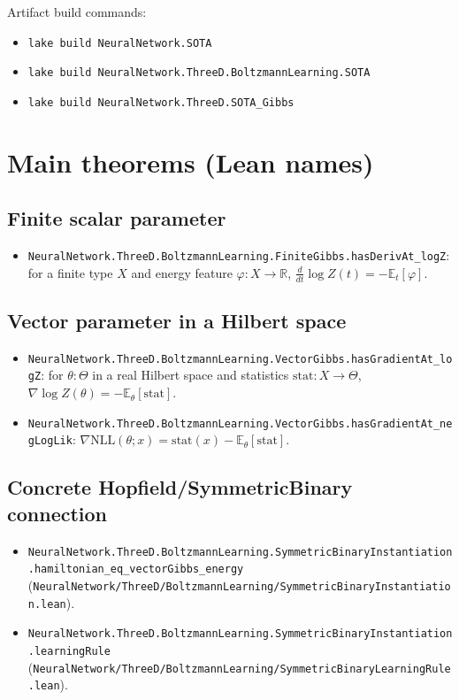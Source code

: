 \documentclass[11pt]{article}
\newcommand{\lean}[1]{\texttt{#1}}
\newcommand{\file}[1]{\texttt{#1}}
\begin{document}
Artifact build commands:
\begin{itemize}[leftmargin=2em]
\item \lean{lake build NeuralNetwork.SOTA}
\item \lean{lake build NeuralNetwork.ThreeD.BoltzmannLearning.SOTA}
\item \lean{lake build NeuralNetwork.ThreeD.SOTA_Gibbs}
\end{itemize}

\section{Main theorems (Lean names)}
\subsection{Finite scalar parameter}
\begin{itemize}[leftmargin=2em]
\item \lean{NeuralNetwork.ThreeD.BoltzmannLearning.FiniteGibbs.hasDerivAt_logZ}:
  for a finite type \(X\) and energy feature \(\varphi : X \to \mathbb{R}\),
  \(\frac{d}{dt} \log Z(t) = -\mathbb{E}_t[\varphi]\).
\end{itemize}

\subsection{Vector parameter in a Hilbert space}
\begin{itemize}[leftmargin=2em]
\item \lean{NeuralNetwork.ThreeD.BoltzmannLearning.VectorGibbs.hasGradientAt_logZ}:
  for \(\theta : \Theta\) in a real Hilbert space and statistics
  \(\mathrm{stat} : X \to \Theta\),
  \(\nabla \log Z(\theta) = -\mathbb{E}_{\theta}[\mathrm{stat}]\).
\item \lean{NeuralNetwork.ThreeD.BoltzmannLearning.VectorGibbs.hasGradientAt_negLogLik}:
  \(\nabla\mathrm{NLL}(\theta;x)=\mathrm{stat}(x)-\mathbb{E}_\theta[\mathrm{stat}]\).
\end{itemize}

\subsection{Concrete Hopfield/SymmetricBinary connection}
\begin{itemize}[leftmargin=2em]
\item \lean{NeuralNetwork.ThreeD.BoltzmannLearning.SymmetricBinaryInstantiation.hamiltonian_eq_vectorGibbs_energy}
  (\file{NeuralNetwork/ThreeD/BoltzmannLearning/SymmetricBinaryInstantiation.lean}).
\item \lean{NeuralNetwork.ThreeD.BoltzmannLearning.SymmetricBinaryInstantiation.learningRule}
  (\file{NeuralNetwork/ThreeD/BoltzmannLearning/SymmetricBinaryLearningRule.lean}).
\end{itemize}
\end{document}
